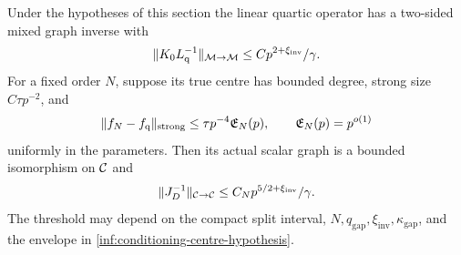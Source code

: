 \begin{theorem}
\label{inf:mixed-conditioning}
Under the hypotheses of this section the linear quartic operator
has a two-sided mixed graph inverse with
\begin{equation}\label{inf:linear-mixed-inverse}
 \lVert K_0L_{\mathrm q}^{-1}\rVert_{\mathcal M\to\mathcal M}
 \le C p^{2+\xi_{\mathrm{inv}}}/\gamma.
\end{equation}
For a fixed order $N$, suppose its true centre has bounded degree,
strong size $C\tau p^{-2}$, and
\begin{equation}\label{inf:conditioning-centre-hypothesis}
 \lVert f_N-f_{\mathrm q}\rVert_{\mathrm{strong}}
 \le\tau p^{-4}\mathfrak E_N(p),\qquad
 \mathfrak E_N(p)=p^{o(1)}
\end{equation}
uniformly in the parameters. Then its actual scalar graph is a
bounded isomorphism on $\mathcal C$ and
\begin{equation}\label{inf:conditioning-final-inverse}
 \lVert J_D^{-1}\rVert_{\mathcal C\to\mathcal C}
 \le C_Np^{5/2+\xi_{\mathrm{inv}}}/\gamma.
\end{equation}
The threshold may depend on the compact split interval,
$N,q_{\mathrm{gap}},\xi_{\mathrm{inv}},\kappa_{\mathrm{gap}}$, and
the envelope in \eqref{inf:conditioning-centre-hypothesis}.
\end{theorem}
